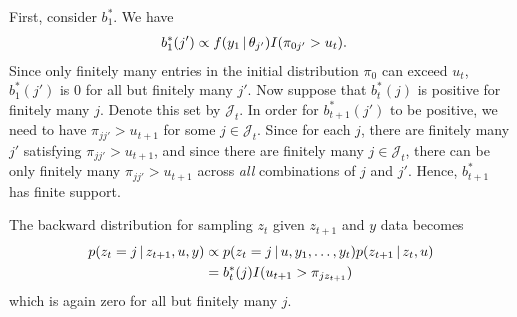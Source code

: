 First, consider $b^*_1$.  We have
\begin{align}
  b^*_1(j') &\propto f(y_{1} \, \vert \, \theta_{j'}) I(\pi_{0j'} > u_t) .
\end{align}
Since only finitely many entries in the initial distribution $\pi_0$
can exceed $u_t$, $b^*_1(j')$ is 0 for all but finitely many $j'$.
Now suppose that $b^*_t(j)$ is positive for finitely many $j$.  Denote
this set by $\mathcal{J}_t$.  In order for $b^*_{t+1}(j')$ to be
positive, we need to have $\pi_{jj'} > u_{t+1}$ for some $j \in
\mathcal{J}_t$.  Since for each $j$, there are finitely many $j'$ satisfying
$\pi_{jj'} > u_{t+1}$, and since there are finitely many $j \in
\mathcal{J}_t$, there can be only finitely many $\pi_{jj'} > u_{t+1}$ across
{\em all} combinations of $j$ and $j'$.  Hence, $b^*_{t+1}$ has finite support.

The backward distribution for sampling $z_{t}$ given $z_{t+1}$ and $y$
data becomes
\begin{align}
  p(z_t = j \, \vert \, z_{t+1}, u, y) &\propto p(z_{t} = j \, \vert \, u, y_1,
  \dots, y_{t}) p(z_{t+1} \, \vert \, z_t, u) \\
  &= b^*_{t}(j) I(u_{t+1} > \pi_{jz_{t+1}})
\end{align}
which is again zero for all but finitely many $j$.

